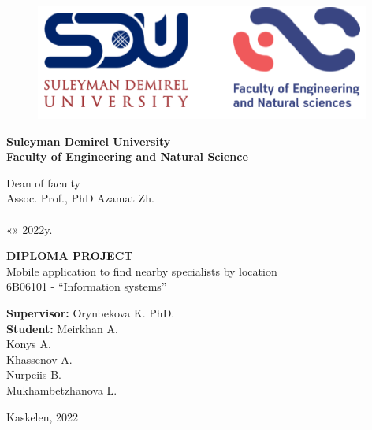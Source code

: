 \newpage
\pagestyle{empty}

\begin{center}
\begin{figure}[h]
    \centering
    \includegraphics[scale=0.55]{images/sdulogo1.png}
\end{figure}
\vspace{-0,4cm}
\textbf{Suleyman Demirel University \\
Faculty of Engineering and Natural Science}\\

\vspace{2cm}
\begin{flushright}
Dean of faculty\\
Assoc. Prof., PhD Azamat Zh.\\
\vspace{0.2cm}
\underline{\hspace{7cm}}\\
\vspace{0.2cm}
«\underline{\hspace{0.5cm}}» \underline{\hspace{4.5cm}} 2022y.
\end{flushright}

\vspace{2cm}
\Large
\textbf{DIPLOMA PROJECT}\\
\vspace{0,5cm}
\normalsize
Mobile application to find nearby specialists by location\\
\vspace{0,5cm}
6B06101 - \textquotedblleft Information systems\textquotedblright \\

\vspace{3cm}
\begin{flushright}
\textbf{Supervisor:} \hspace{1.9cm} Orynbekova K. PhD.\\
\textbf{Student:} \hspace{4.3cm} Meirkhan A. \\ Konys A. \\ Khassenov A. \\ Nurpeiis B.\\ Mukhambetzhanova L.\\
\end{flushright}




\vfill
Kaskelen, 2022
\end{center}